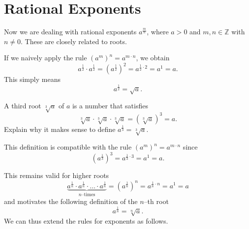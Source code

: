 \section{Rational Exponents}
Now we are dealing with rational exponents $a^{\frac{m}{n}}$, where $a>0$ and $m,n\in\mathbb Z$ with $n\neq 0$.
These are closely related to roots.
\begin{example}
	If we naively apply the rule $(a^m)^n=a^{m\cdot n}$, we obtain
	\begin{equation*}
		a^{\frac{1}{2}}\cdot a^{\frac{1}{2}}
		=\left(a^{\frac{1}{2}}\right)^2
		=a^{\frac{1}{2}\cdot 2}=a^1=a.
	\end{equation*}
	This simply means
	\begin{equation*}
		a^{\frac{1}{2}}=\sqrt{a}.
	\end{equation*}
\end{example}
\begin{exercise}
	A third root $\sqrt[3]{a}$ of $a$ is a number that satisfies
	\begin{equation*}
		\sqrt[3]{a}\cdot\sqrt[3]{a}\cdot\sqrt[3]{a}=\left(\sqrt[3]{a}\right)^3=a.
	\end{equation*}
	Explain why it makes sense to define $a^{\frac{1}{3}}=\sqrt[3]{a}$.
\end{exercise}
\begin{solution*}
	This definition is compatible with the rule $(a^m)^n=a^{m\cdot n}$ since
	\begin{equation*}
		\left(a^{\frac{1}{3}}\right)^3=a^{\frac{1}{3}\cdot 3}=a^1=a.
	\end{equation*}
\end{solution*}
This remains valid for higher roots
\begin{equation*}
	\underbrace{a^{\frac{1}{n}}\cdot a^{\frac{1}{n}}\cdot\ldots\cdot a^{\frac{1}{n}}}_{n\text{--times}}
	=\left(a^{\frac{1}{n}}\right)^n=a^{\frac{1}{n}\cdot n}=a^1=a
\end{equation*}
and motivates the following definition of the $n$--th root
\begin{equation*}
	a^{\frac{1}{n}}=\sqrt[n]{a}.
\end{equation*}
We can thus extend the rules for exponents as follows.
